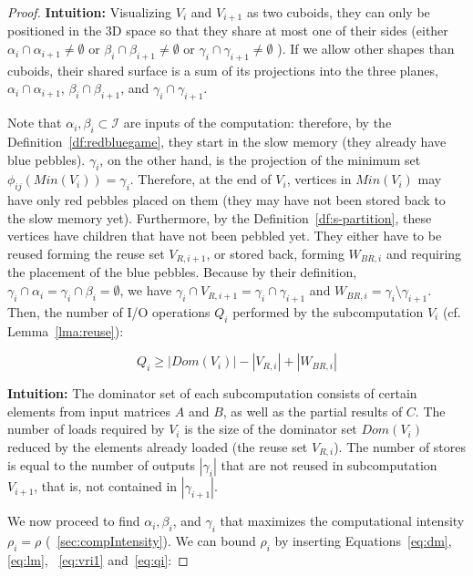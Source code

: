 \begin{proof}
	\textbf{Intuition:}
	Visualizing $V_i$ and $V_{i+1}$ as two cuboids, they can only be positioned 
	in 
	the 3D space so that 
	they share at most one of their sides (either $\alpha_i \cap \alpha_{i+1} 
	\ne 
	\emptyset$ or  $\beta_i \cap \beta_{i+1} \ne \emptyset$ or  $\gamma_i \cap 
	\gamma_{i+1} \ne \emptyset$ ). If we allow other shapes than cuboids, 
	their shared surface is a sum of its projections into the three planes,  
	$\alpha_i \cap \alpha_{i+1}$,   $\beta_i \cap \beta_{i+1}$, and $\gamma_i 
	\cap 
	\gamma_{i+1}$.
	
	
	Note that $\alpha_i, \beta_i \subset \mathcal{I}$ are inputs of the 
	computation:
	therefore,
	by the Definition~\ref{df:redbluegame}, they start in the slow memory (they 
	already have blue 
	pebbles).
	$\gamma_i$, on the other hand, is the projection of the
	minimum set $\phi_{ij}(Min(V_i)) = \gamma_i$. Therefore, at the end of 
	$V_i$, 
	vertices in $Min(V_i)$ may have only red pebbles
	placed on them (they may have not been stored back to the slow memory yet). 
	Furthermore, by the Definition~\ref{df:s-partition}, these 
	vertices have children that have not been pebbled yet. 
	They either have to be reused forming the reuse set $V_{R,i+1}$, or
	stored back, forming $W_{BR,i}$ and requiring the placement of the blue 
	pebbles. 
	Because by their definition, $\gamma_i \cap \alpha_i = \gamma_i \cap 
	\beta_i = 
	\emptyset$, we have $\gamma_i \cap V_{R,i+1} =  \gamma_i \cap
	\gamma_{i+1}$ and $W_{BR,i} =  \gamma_i \setminus
	\gamma_{i+1}$. Then, the number of I/O operations $Q_i$ performed by the 
	subcomputation $V_i$ (cf. Lemma~\ref{lma:reuse}):
	
	\begin{equation}
	\label{eq:qi}
	Q_i \ge |Dom(V_i)| - |V_{R,i}| + |W_{BR,i}|
	\end{equation} 
	
	\textbf{Intuition:} The dominator set of each subcomputation consists of 
	certain
	elements from input matrices $A$ and $B$, as well as the partial results
	of $C$. The number of loads
	required by $V_i$ is the size of the dominator set $Dom(V_i)$ reduced by the
	elements already loaded (the reuse set $V_{R,i}$). The number of stores is 
	equal to the
	number of outputs $|\gamma_i|$  that are not reused in subcomputation 
	$V_{i+1}$, that is, 
	not contained in $|\gamma_{i+1}|$.
	
	We now proceed to find $\alpha_i, \beta_i$, and $\gamma_i$
	that maximizes the computational
	intensity $\rho_i = \rho$ (~\cref{sec:compIntensity}).
	We can bound $\rho_i$ by inserting Equations~\ref{eq:dm}, \ref{eq:lm}, 
	~\ref{eq:vri1} and~\ref{eq:qi}:
	

\end{proof}
